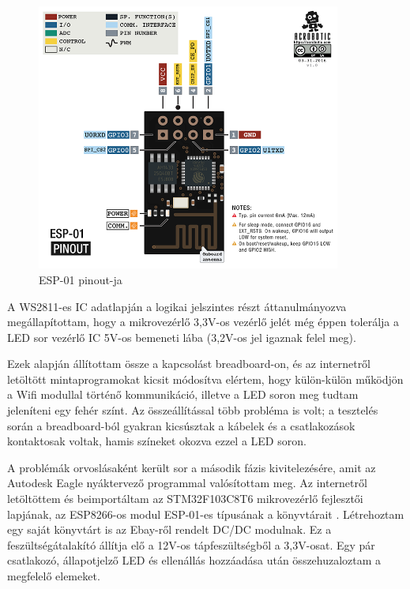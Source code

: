 \documentclass[../main.tex]{subfiles}
\begin{document}
        \begin{figure}[h!]
            \centering
                \includegraphics[width=10cm]{resources/pcb_res/esp8266_esp01_pinout.png}
            \caption{ESP-01 pinout-ja\cite{esp_pinout}}
            \label{fig:eps01_pinout}
        \end{figure}
        
        A WS2811-es IC adatlapján a logikai jelszintes részt áttanulmányozva megállapítottam, hogy a mikrovezérlő 3,3V-os vezérlő jelét még éppen tolerálja a LED sor vezérlő IC 5V-os bemeneti lába (3,2V-os jel igaznak felel meg). 
        
        Ezek alapján állítottam össze a kapcsolást breadboard-on, és az internetről letöltött mintaprogramokat kicsit módosítva elértem, hogy külön-külön működjön a Wifi modullal történő kommunikáció, illetve a LED soron meg tudtam jeleníteni egy fehér színt. Az összeállítással több probléma is volt; a tesztelés során a breadboard-ból gyakran kicsúsztak a kábelek és a csatlakozások kontaktosak voltak, hamis színeket okozva ezzel a LED soron. 
        
        A problémák orvoslásaként került sor a második fázis kivitelezésére, amit az Autodesk Eagle nyáktervező programmal valósítottam meg. Az internetről letöltöttem és beimportáltam az STM32F103C8T6 mikrovezérlő fejlesztői lapjának, az ESP8266-os modul ESP-01-es típusának a könyvtárait \citep{armMbed}\cite{esp_eagle_lib}. Létrehoztam egy saját könyvtárt is az Ebay-ről rendelt DC/DC modulnak. Ez a feszültségátalakító állítja elő a 12V-os tápfeszültségből a 3,3V-osat. Egy pár csatlakozó, állapotjelző LED és ellenállás hozzáadása után összehuzaloztam a megfelelő elemeket. 
        
\end{document}
